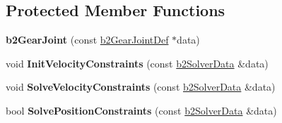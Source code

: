 \subsection*{Protected Member Functions}
\begin{DoxyCompactItemize}
\item 
\hypertarget{classb2_gear_joint_a4b247c79e74cb1e5b906527fe7d151ce}{{\bfseries b2\-Gear\-Joint} (const \hyperlink{structb2_gear_joint_def}{b2\-Gear\-Joint\-Def} $\ast$data)}\label{classb2_gear_joint_a4b247c79e74cb1e5b906527fe7d151ce}

\item 
\hypertarget{classb2_gear_joint_ad1d8e7b5434ad899c510dd223a72e6cb}{void {\bfseries Init\-Velocity\-Constraints} (const \hyperlink{structb2_solver_data}{b2\-Solver\-Data} \&data)}\label{classb2_gear_joint_ad1d8e7b5434ad899c510dd223a72e6cb}

\item 
\hypertarget{classb2_gear_joint_a7684e28e93a3dc88a0e84424be937355}{void {\bfseries Solve\-Velocity\-Constraints} (const \hyperlink{structb2_solver_data}{b2\-Solver\-Data} \&data)}\label{classb2_gear_joint_a7684e28e93a3dc88a0e84424be937355}

\item 
\hypertarget{classb2_gear_joint_a6be119465783ecb3f055695c7a713de2}{bool {\bfseries Solve\-Position\-Constraints} (const \hyperlink{structb2_solver_data}{b2\-Solver\-Data} \&data)}\label{classb2_gear_joint_a6be119465783ecb3f055695c7a713de2}

\end{DoxyCompactItemize}
